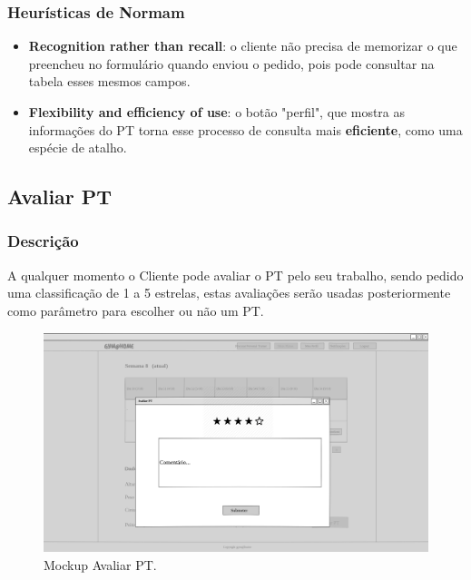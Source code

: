 \subsubsection{Heurísticas de Normam}
\begin{itemize}
    \item \textbf{Recognition rather than recall}: o cliente não precisa de memorizar o que preencheu no formulário quando enviou o pedido, pois pode consultar na tabela esses mesmos campos.
    \item \textbf{Flexibility and efficiency of use}: o botão "perfil", que mostra as informações do PT torna esse processo de consulta mais \textbf{eficiente}, como uma espécie de atalho.
\end{itemize}

\subsection{Avaliar PT}
\label{subsec:avaliarpt}

\subsubsection{Descrição}
\hspace{5mm} A qualquer momento o Cliente pode avaliar o PT pelo seu trabalho, sendo pedido uma classificação de 1 a 5 estrelas, estas avaliações serão usadas posteriormente como parâmetro para escolher ou não um PT.

\begin{figure}[H]
    \centering
    \includegraphics[scale=0.25]{images/mockups/cliente_avaliar_pt.png}
    \caption{Mockup Avaliar PT.}
    \label{fig:mockupavaliarpt}
\end{figure}

